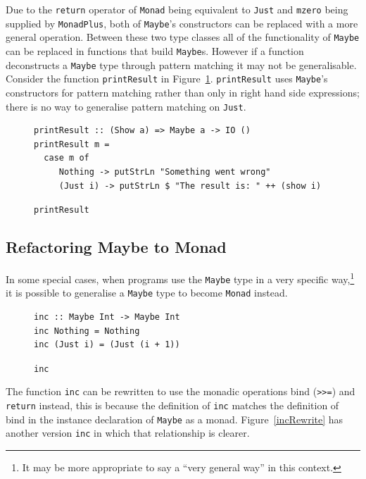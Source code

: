 Due to the \texttt{return} operator of \texttt{Monad} being equivalent to \texttt{Just} and \texttt{mzero} being supplied by \texttt{MonadPlus}, both of \texttt{Maybe}'s constructors can be replaced with a more general operation. Between these two type classes all of the functionality of \texttt{Maybe} can be replaced in functions that build \texttt{Maybe}s. However if a function deconstructs a \texttt{Maybe} type through pattern matching it may not be generalisable. Consider the function \texttt{printResult} in Figure~\ref{printRes}. \texttt{printResult} uses \texttt{Maybe}'s constructors for pattern matching rather than only in right hand side expressions; there is no way to generalise pattern matching on \texttt{Just}.

\begin{figure}[t]
\begin{lstlisting}
printResult :: (Show a) => Maybe a -> IO ()
printResult m =
  case m of
     Nothing -> putStrLn "Something went wrong"
     (Just i) -> putStrLn $ "The result is: " ++ (show i)
\end{lstlisting}
\caption{\texttt{printResult}}
\label{printRes}
\end{figure}

\subsection{Refactoring Maybe to Monad}\label{genMonad}

In some special cases, when programs use the \texttt{Maybe} type in a very specific way,\footnote{It may be more appropriate to say a ``very general way'' in this context.} it is possible to generalise a \texttt{Maybe} type to become \texttt{Monad} instead.

\begin{figure}[t]
\begin{lstlisting}
inc :: Maybe Int -> Maybe Int
inc Nothing = Nothing
inc (Just i) = (Just (i + 1))
\end{lstlisting}
\caption{\texttt{inc}}
\label{mmp1}
\end{figure}

The function \texttt{inc} can be rewritten to use the monadic operations bind (\texttt{>>=}) and \texttt{return} instead, this is because the definition of \texttt{inc} matches the definition of bind in the instance declaration of \texttt{Maybe} as a monad. Figure~\ref{incRewrite} has another version \texttt{inc} in which that relationship is clearer.

